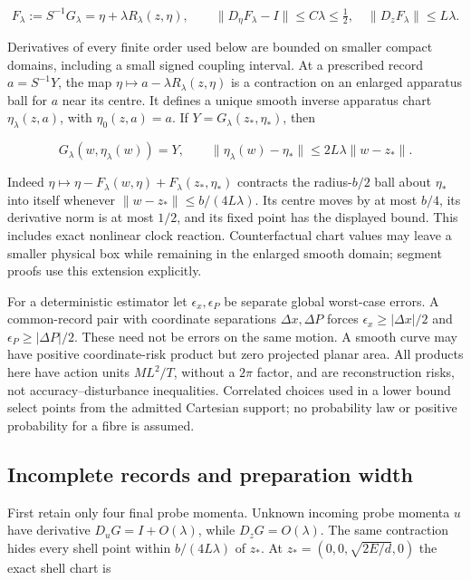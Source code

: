 \documentclass[11pt,a4paper]{article}
\begin{document}
\[F_\lambda:=S^{-1}G_\lambda=\eta+\lambda R_\lambda(z,\eta),\qquad
\|D_\eta F_\lambda-I\|\le C\lambda\le\tfrac12,
\quad\|D_zF_\lambda\|\le L\lambda.\]

Derivatives of every finite order used below are bounded on smaller
compact domains, including a small signed coupling interval. At a
prescribed record \(a=S^{-1}Y\), the map
\(\eta\mapsto a-\lambda R_\lambda(z,\eta)\) is a contraction on an
enlarged apparatus ball for \(a\) near its centre. It defines a unique
smooth inverse apparatus chart \(\eta_\lambda(z,a)\), with
\(\eta_0(z,a)=a\). If \(Y=G_\lambda(z_*,\eta_*)\), then

\[G_\lambda(w,\eta_\lambda(w))=Y,\qquad
\|\eta_\lambda(w)-\eta_*\|\le2L\lambda\|w-z_*\|.\]

Indeed \(\eta\mapsto\eta-F_\lambda(w,\eta)+F_\lambda(z_*,\eta_*)\)
contracts the radius-\(b/2\) ball about \(\eta_*\) into itself whenever
\(\|w-z_*\|\le b/(4L\lambda)\). Its centre moves by at most \(b/4\), its
derivative norm is at most \(1/2\), and its fixed point has the
displayed bound. This includes exact nonlinear clock reaction.
Counterfactual chart values may leave a smaller physical box while
remaining in the enlarged smooth domain; segment proofs use this
extension explicitly.

For a deterministic estimator let \(\epsilon_x,\epsilon_P\) be separate
global worst-case errors. A common-record pair with coordinate
separations \(\Delta x,\Delta P\) forces \(\epsilon_x\ge|\Delta x|/2\)
and \(\epsilon_P\ge|\Delta P|/2\). These need not be errors on the same
motion. A smooth curve may have positive coordinate-risk product but
zero projected planar area. All products here have action units
\(ML^2/T\), without a \(2\pi\) factor, and are reconstruction risks, not
accuracy--disturbance inequalities. Correlated choices used in a lower
bound select points from the admitted Cartesian support; no probability
law or positive probability for a fibre is assumed.

\hypertarget{incomplete-records-and-preparation-width}{%
\subsection{Incomplete records and preparation
width}\label{incomplete-records-and-preparation-width}}

First retain only four final probe momenta. Unknown incoming probe
momenta \(u\) have derivative \(D_uG=I+O(\lambda)\), while
\(D_zG=O(\lambda)\). The same contraction hides every shell point within
\(b/(4L\lambda)\) of \(z_*\). At \(z_*=(0,0,\sqrt{2E/d},0)\) the exact
shell chart is
\end{document}
